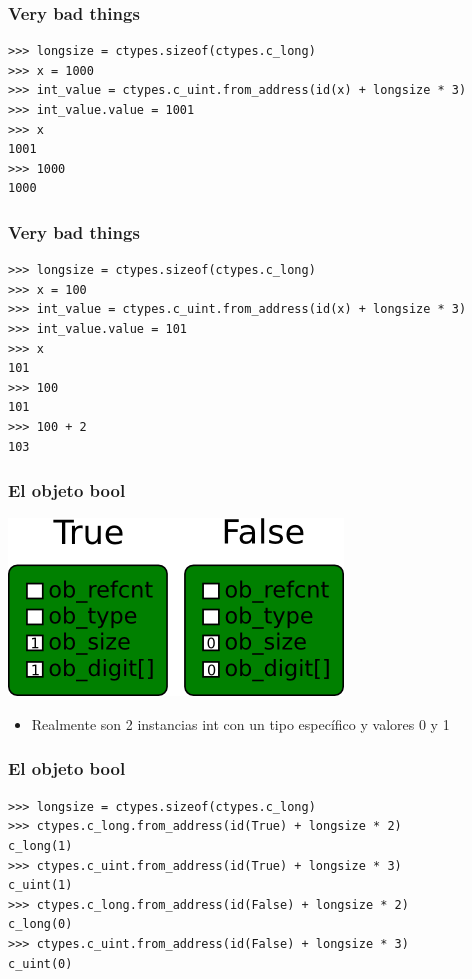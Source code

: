 \documentclass[10pt]{beamer}
\begin{document}
  \begin{frame}[containsverbatim]
    \frametitle{Very bad things}
    \begin{verbatim}
>>> longsize = ctypes.sizeof(ctypes.c_long)
>>> x = 1000
>>> int_value = ctypes.c_uint.from_address(id(x) + longsize * 3)
>>> int_value.value = 1001
>>> x
1001
>>> 1000
1000
    \end{verbatim}
  \end{frame}

  \begin{frame}[containsverbatim]
    \frametitle{Very bad things}
    \begin{verbatim}
>>> longsize = ctypes.sizeof(ctypes.c_long)
>>> x = 100
>>> int_value = ctypes.c_uint.from_address(id(x) + longsize * 3)
>>> int_value.value = 101
>>> x
101
>>> 100
101
>>> 100 + 2
103
    \end{verbatim}
  \end{frame}

  \begin{frame}[containsverbatim]
    \frametitle{El objeto bool}
    \begin{center}\includegraphics{img/True-False.png}\end{center}
    \begin{itemize}
      \item Realmente son 2 instancias int con un tipo específico y valores 0 y 1
    \end{itemize}
  \end{frame}

  \begin{frame}[containsverbatim]
    \frametitle{El objeto bool}
    \begin{verbatim}
>>> longsize = ctypes.sizeof(ctypes.c_long)
>>> ctypes.c_long.from_address(id(True) + longsize * 2)
c_long(1)
>>> ctypes.c_uint.from_address(id(True) + longsize * 3)
c_uint(1)
>>> ctypes.c_long.from_address(id(False) + longsize * 2)
c_long(0)
>>> ctypes.c_uint.from_address(id(False) + longsize * 3)
c_uint(0)
    \end{verbatim}
  \end{frame}
\end{document}
